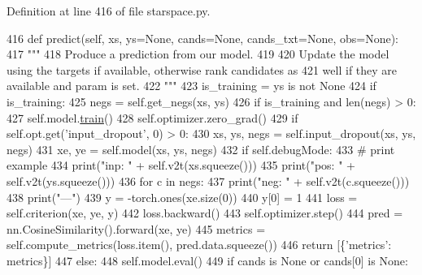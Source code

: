 Definition at line 416 of file starspace.\+py.


\begin{DoxyCode}
416     \textcolor{keyword}{def }predict(self, xs, ys=None, cands=None, cands\_txt=None, obs=None):
417         \textcolor{stringliteral}{"""}
418 \textcolor{stringliteral}{        Produce a prediction from our model.}
419 \textcolor{stringliteral}{}
420 \textcolor{stringliteral}{        Update the model using the targets if available, otherwise rank candidates as}
421 \textcolor{stringliteral}{        well if they are available and param is set.}
422 \textcolor{stringliteral}{        """}
423         is\_training = ys \textcolor{keywordflow}{is} \textcolor{keywordflow}{not} \textcolor{keywordtype}{None}
424         \textcolor{keywordflow}{if} is\_training:
425             negs = self.get\_negs(xs, ys)
426             \textcolor{keywordflow}{if} is\_training \textcolor{keywordflow}{and} len(negs) > 0:
427                 self.model.\hyperlink{namespaceprojects_1_1mastering__the__dungeon_1_1mturk_1_1tasks_1_1MTD_1_1run_a36a5f4f6f9df0611a6818610518d2cf0}{train}()
428                 self.optimizer.zero\_grad()
429                 \textcolor{keywordflow}{if} self.opt.get(\textcolor{stringliteral}{'input\_dropout'}, 0) > 0:
430                     xs, ys, negs = self.input\_dropout(xs, ys, negs)
431                 xe, ye = self.model(xs, ys, negs)
432                 \textcolor{keywordflow}{if} self.debugMode:
433                     \textcolor{comment}{# print example}
434                     print(\textcolor{stringliteral}{"inp: "} + self.v2t(xs.squeeze()))
435                     print(\textcolor{stringliteral}{"pos: "} + self.v2t(ys.squeeze()))
436                     \textcolor{keywordflow}{for} c \textcolor{keywordflow}{in} negs:
437                         print(\textcolor{stringliteral}{"neg: "} + self.v2t(c.squeeze()))
438                     print(\textcolor{stringliteral}{"---"})
439                 y = -torch.ones(xe.size(0))
440                 y[0] = 1
441                 loss = self.criterion(xe, ye, y)
442                 loss.backward()
443                 self.optimizer.step()
444                 pred = nn.CosineSimilarity().forward(xe, ye)
445                 metrics = self.compute\_metrics(loss.item(), pred.data.squeeze())
446                 \textcolor{keywordflow}{return} [\{\textcolor{stringliteral}{'metrics'}: metrics\}]
447         \textcolor{keywordflow}{else}:
448             self.model.eval()
449             \textcolor{keywordflow}{if} cands \textcolor{keywordflow}{is} \textcolor{keywordtype}{None} \textcolor{keywordflow}{or} cands[0] \textcolor{keywordflow}{is} \textcolor{keywordtype}{None}:

\end{DoxyCode}
